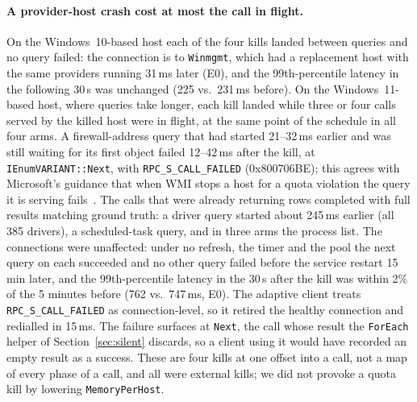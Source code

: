 \documentclass[letterpaper,twocolumn,10pt]{article}
\newcommand{\code}[1]{\texttt{\small #1}}
\newcommand{\hr}[1]{\texttt{\small #1}}
\begin{document}
\paragraph{A provider-host crash cost at most the call in flight.}
On the Windows~10-based host each of the four kills landed between queries and no query failed: the connection is to \code{Winmgmt}, which had a replacement host with the same providers running 31\,ms later (E0), and the 99th-percentile latency in the following 30\,s was unchanged (225 vs.\ 231\,ms before).
On the Windows~11-based host, where queries take longer, each kill landed while three or four calls served by the killed host were in flight, at the same point of the schedule in all four arms.
A firewall-address query that had started 21--32\,ms earlier and was still waiting for its first object failed 12--42\,ms after the kill, at \code{IEnumVARIANT::Next}, with \hr{RPC\_S\_CALL\_FAILED} (0x800706BE); this agrees with Microsoft's guidance that when WMI stops a host for a quota violation the query it is serving fails~\cite{ms-quota-guide}.
The calls that were already returning rows completed with full results matching ground truth: a driver query started about 245\,ms earlier (all 385 drivers), a scheduled-task query, and in three arms the process list.
The connections were unaffected: under no refresh, the timer and the pool the next query on each succeeded and no other query failed before the service restart 15\,min later, and the 99th-percentile latency in the 30\,s after the kill was within 2\% of the 5 minutes before (762 vs.\ 747\,ms, E0).
The adaptive client treats \hr{RPC\_S\_CALL\_FAILED} as connection-level, so it retired the healthy connection and redialled in 15\,ms.
The failure surfaces at \code{Next}, the call whose result the \code{ForEach} helper of Section~\ref{sec:silent} discards, so a client using it would have recorded an empty result as a success.
These are four kills at one offset into a call, not a map of every phase of a call, and all were external kills; we did not provoke a quota kill by lowering \code{MemoryPerHost}.
\end{document}

